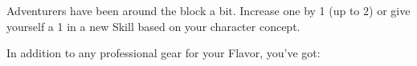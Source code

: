 {  Adventurers have been around the block a bit.  Increase one  by 1 (up to 2) or give yourself a 1 in a new Skill based on your character concept.


  In addition to any professional gear for your Flavor, you've got:

\newpage
}